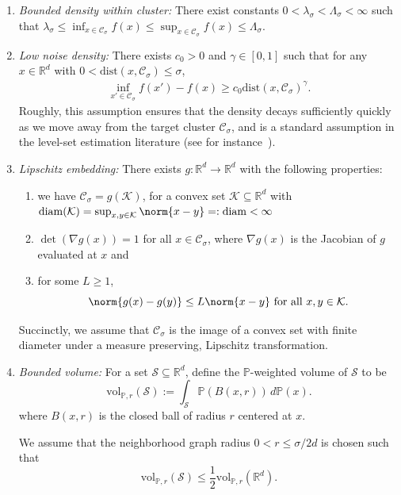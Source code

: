 \documentclass{article}
\newcommand{\Reals}{\mathbb{R}}
\newcommand{\diam}{\mathrm{diam}}
\newcommand{\vol}{\mathrm{vol}}
\newcommand{\1}{\mathbf{1}}
\newcommand{\Rd}{\Reals^d}
\newcommand{\Cset}{\mathcal{C}}
\newcommand{\Csig}{\Cset_{\sigma}}
\newcommand{\Pbb}{\mathbb{P}}
\newcommand{\dist}{\mathrm{dist}}
\theoremstyle{alden}
\theoremstyle{aldenthm}
\theoremstyle{definition}
\theoremstyle{remark}
\begin{document}
\begin{enumerate}[label=(A\arabic*)]
	\item
	\label{asmp: bounded_density}
	\emph{Bounded density within cluster:} There exist constants
	$0<\lambda_{\sigma}< \Lambda_{\sigma}<\infty$ such that 
	$\lambda_{\sigma} \leq \inf_{x \in \Csig} f(x) \leq \sup_{x \in \Csig} f(x)
	\leq \Lambda_{\sigma}$. 
	
	
	\item 
	\label{asmp: low_noise_density}
	\emph{Low noise density:} There exists $c_0 > 0$ and $\gamma \in [0,1]$ such that for any $x \in \Rd$ with $0 < \dist(x, \Csig) \leq \sigma$,   
	\begin{align*}
	\inf_{x' \in \Csig} f(x') - f(x) \geq  c_0 \dist(x, \Csig)^{\gamma}. 
	\end{align*}
	Roughly, 
	this assumption ensures that the density decays sufficiently quickly as we move away from
	the target cluster $\Csig$, and is a standard assumption in the level-set estimation literature
	(see for instance~\cite{singh2009}).
	
	\item
	\label{asmp: embedding}
	\emph{Lipschitz embedding:}
	There exists $g: \Reals^d \to \Reals^d$ with the following properties: 
	\begin{enumerate}
		\item we have $\Csig = g(\mathcal{K})$, for a convex set $\mathcal{K} \subseteq \Rd$
		with $\mathrm{diam}(\mathcal{K}) = \sup_{x,y \in \mathcal{K}}\norm{x - y} =:
		\diam < \infty$
		\item $\det(\nabla g (x)) = 1$ for all $x \in \Csig$, where
		$\nabla g(x)$ is the Jacobian of $g$ evaluated at $x$ and
		\item for some $L
		\geq 1$,   
		\begin{equation*}
		\norm{g(x) - g(y)} \leq L \norm{x - y} ~
		\text{for all $x,y \in \mathcal{K}$}. 
		\end{equation*}
	\end{enumerate}
	Succinctly, we assume that $\Csig$ is the image of a convex set with finite diameter 
	under a  measure preserving, Lipschitz transformation. 
	
	\item
	\label{asmp: bounded_volume}
	\emph{Bounded volume:}
	For a set $\mathcal{S} \subseteq \Reals^d$, define the $\Pbb$-weighted volume of $\mathcal{S}$ to be
	\begin{equation}
	\label{eqn:volume}
	\vol_{\Pbb,r}(\mathcal{S}) := \int_{\mathcal{S}} \Pbb(B(x,r)) \,d\Pbb(x).
	\end{equation}
	where $B(x,r)$ is the closed ball of radius $r$ centered at $x$.
	
	We assume that the neighborhood graph radius $0 < r \leq \sigma/2d$ is chosen such that
	\begin{equation*}
	\vol_{\Pbb,r}(\mathcal{S}) \leq \frac{1}{2}\vol_{\Pbb,r}(\Reals^d).
	\end{equation*}
\end{enumerate}
\end{document}
